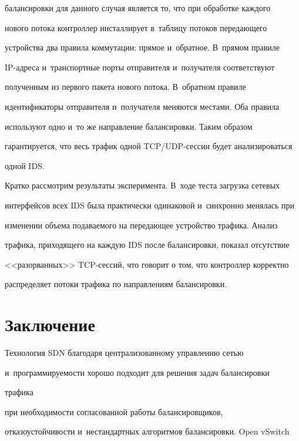 балансировки для данного случая является то, что при обработке каждого 


нового потока контроллер инсталлирует в~таблицу потоков передающего 


устройства два правила коммутации: прямое и~обратное. В~прямом правиле  


IP-ад\-ре\-са и~транспортные порты отправителя и~получателя соответствуют 


полученным из первого пакета нового потока. В~обратном правиле 


идентификаторы отправителя и~получателя меняются местами. Оба правила 


используют одно и~то же направление балансировки. Таким образом 


гарантируется, что весь трафик одной TCP/UDP-сес\-сии будет анализироваться 


одной IDS.


  


  Кратко рассмотрим результаты эксперимента. В~ходе теста загрузка сетевых 


интерфейсов всех IDS была практически одинаковой и~синхронно менялась при 


изменении объема подаваемого на передающее устройство трафика. Анализ 


трафика, приходящего на каждую IDS после балансировки, показал отсутствие 


<<разорванных>> TCP-сес\-сий, что говорит о том, что контроллер корректно 


распределяет потоки трафика по направлениям балансировки.





\section{Заключение}





  Технология SDN благодаря централизованному управлению сетью 


и~программируемости хорошо подходит для решения задач балансировки 


трафика\linebreak


 при необходимости согласованной работы балансировщиков, 


от\-ка\-зо\-устой\-чи\-вости и~нестандартных алгоритмов балансировки. Open vSwitch 


